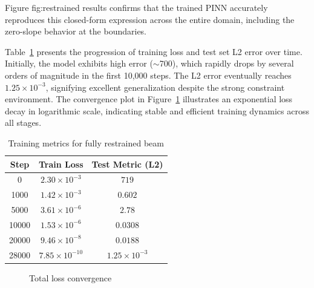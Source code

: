 \documentclass[12pt]{article}
\begin{document}
Figure {fig:restrained results} confirms that the trained PINN accurately reproduces this closed-form expression across the entire domain, including the zero-slope behavior at the boundaries.

Table~\ref{tab:restrained_convergence} presents the progression of training loss and test set L2 error over time. Initially, the model exhibits high error ($\sim$700), which rapidly drops by several orders of magnitude in the first 10,000 steps. The L2 error eventually reaches $1.25 \times 10^{-3}$, signifying excellent generalization despite the strong constraint environment. The convergence plot in Figure~\ref{fig:restrained_convergence} illustrates an exponential loss decay in logarithmic scale, indicating stable and efficient training dynamics across all stages.

\begin{table}[htbp]
    \centering
    \begin{tabular}{c c c}
        \toprule
        \textbf{Step} & \textbf{Train Loss} & \textbf{Test Metric (L2)} \\
        \midrule
        0 & $2.30 \times 10^{-3}$ & $719$ \\
        1000 & $1.42 \times 10^{-3}$ & $0.602$ \\
        5000 & $3.61 \times 10^{-6}$ & $2.78$ \\
        10000 & $1.53 \times 10^{-6}$ & $0.0308$ \\
        20000 & $9.46 \times 10^{-8}$ & $0.0188$ \\
        28000 & $7.85 \times 10^{-10}$ & $1.25 \times 10^{-3}$ \\
        \bottomrule
    \end{tabular}
    \caption{Training metrics for fully restrained beam}
    \label{tab:restrained_convergence}
\end{table}

\begin{figure}[htbp]
    \centering
    \caption{Total loss convergence}
    \label{fig:restrained_convergence}
\end{figure}
\end{document}
